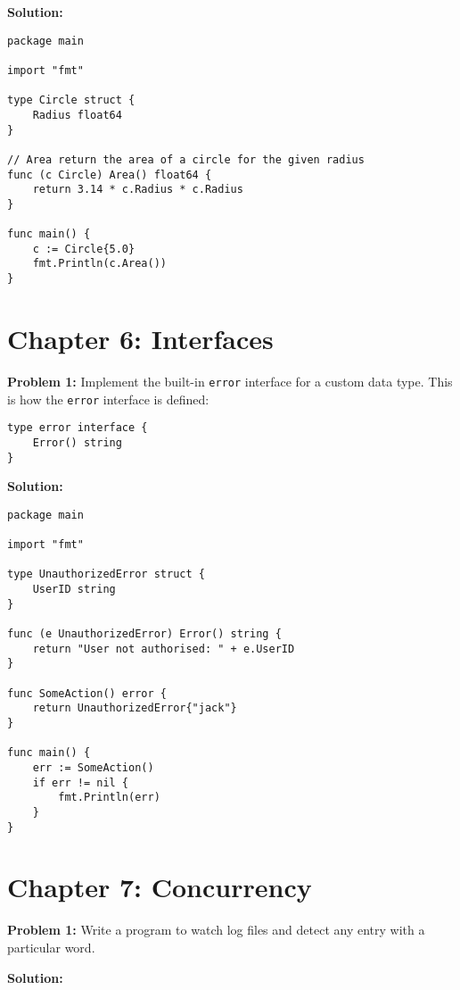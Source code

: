 \textbf{Solution:}

\begin{lstlisting}[numbers=none]
package main

import "fmt"

type Circle struct {
    Radius float64
}

// Area return the area of a circle for the given radius
func (c Circle) Area() float64 {
    return 3.14 * c.Radius * c.Radius
}

func main() {
    c := Circle{5.0}
    fmt.Println(c.Area())
}
\end{lstlisting}

\section*{Chapter 6: Interfaces}

\textbf{Problem 1:} Implement the built-in \texttt{error} interface for a custom data type.  This is how the \texttt{error} interface is defined:

\begin{lstlisting}[numbers=none]
type error interface {
    Error() string
}
\end{lstlisting}

\textbf{Solution:}

\begin{lstlisting}[numbers=none]
package main

import "fmt"

type UnauthorizedError struct {
    UserID string
}

func (e UnauthorizedError) Error() string {
    return "User not authorised: " + e.UserID
}

func SomeAction() error {
    return UnauthorizedError{"jack"}
}

func main() {
    err := SomeAction()
    if err != nil {
        fmt.Println(err)
    }
}
\end{lstlisting}

\section*{Chapter 7: Concurrency}

{\bfseries Problem 1:} Write a program to watch log files and detect
any entry with a particular word.

\textbf{Solution:}

